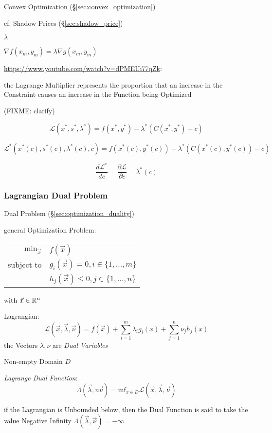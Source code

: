 \fist Convex Optimization (\S\ref{sec:convex_optimization})

cf. Shadow Prices (\S\ref{sec:shadow_price})

$\lambda$

$\nabla f(x_m, y_m) = \lambda\nabla g(x_m, y_m)$

\url{https://www.youtube.com/watch?v=dPMEUi77qZk}:

the Lagrange Multiplier represents the proportion that an increase in the
Constraint causes an increase in the Function being Optimized

(FIXME: clarify)

\[
  \mathcal{L}(x^*,s^*,\lambda^*) = f(x^*,y^*) - \lambda^*(C(x^*,y^*)-c)
\]

\[
  \mathcal{L}^*(x^*(c),s^*(c),\lambda^*(c), c)
    = f(x^*(c),y^*(c)) - \lambda^*(C(x^*(c),y^*(c))-c)
\]

\[
  \frac{d\mathcal{L}^*}{dc} = \frac{\partial{\mathcal{L}}}{\partial{c}} =
  \lambda^*(c)
\]



\subsubsection{Lagrangian Dual Problem}\label{sec:lagrangian_dual}

Dual Problem (\S\ref{sec:optimization_duality})

general Optimization Problem:

\begin{tabular}{r l}
  $\mathrm{min}_{\vec{x}}$ & $f(\vec{x})$      \\
  subject to               & $g_i(\vec{x}) = 0, i \in \{1,\ldots,m\}$ \\
                           & $h_j(\vec{x}) \leq 0, j \in \{1,\ldots,n\}$
\end{tabular}

with $\vec{x} \in \mathbb{R}^n$

Lagrangian:
\[
  \mathcal{L}(\vec{x},\vec{\lambda},\vec{\nu}) =
    f(\vec{x}) + \sum_{i=1}^m\lambda_i g_i(x) + \sum_{j=1}^n \nu_j h_j(x)
\]
the Vectors $\lambda, \nu$ are \emph{Dual Variables}

Non-empty Domain $D$

\emph{Lagrange Dual Function}:
\[
  \Lambda(\vec{\lambda}, \vec{nu}) =
    \mathrm{inf}_{x \in D} \mathcal{L}(\vec{x},\vec{\lambda},\vec{\nu})
\]

if the Lagrangian is Unbounded below, then the Dual Function is said to take
the value Negative Infinity $\Lambda(\vec{\lambda}, \vec{\nu}) = -\infty$

